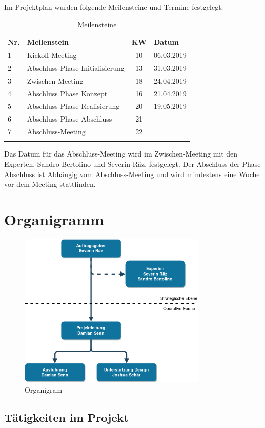 Im Projektplan wurden folgende Meilensteine und Termine festgelegt:

\begin{longtable}[]{@{}llcl@{}}
  \toprule
  Nr. & Meilenstein                     & KW & Datum\tabularnewline
  \midrule
  \endhead
  1   & Kickoff-Meeting                 & 10 & 06.03.2019\tabularnewline
  2   & Abschluss Phase Initialisierung & 13 & 31.03.2019\tabularnewline
  3   & Zwischen-Meeting                & 18 & 24.04.2019\tabularnewline
  4   & Abschluss Phase Konzept         & 16 & 21.04.2019\tabularnewline
  5   & Abschluss Phase Realisierung    & 20 & 19.05.2019\tabularnewline
  6   & Abschluss Phase Abschluss       & 21 & \tabularnewline
  7   & Abschluss-Meeting               & 22 & \tabularnewline
  \bottomrule
  \caption{Meilensteine}
\end{longtable}

Das Datum für das Abschluss-Meeting wird im Zwischen-Meeting mit den Experten, Sandro Bertolino und Severin Räz, festgelegt. Der Abschluss der Phase Abschluss ist Abhängig vom Abschluss-Meeting und wird mindestens eine Woche vor dem Meeting stattfinden.

\clearpage

\section{Organigramm}\label{organigramm}

\begin{figure}[!htb]
  \centering
  \includegraphics[width=0.8\textwidth]{figures/organigram.png}
  \caption{Organigram}
\end{figure}

\subsection{Tätigkeiten im Projekt}\label{tuxe4tigkeiten-im-projekt}

